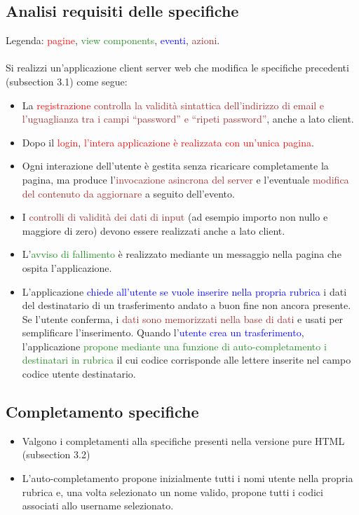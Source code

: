 \documentclass{article}
\begin{document}
\subsection{Analisi requisiti delle specifiche}
Legenda: \textcolor{red}{pagine}, \textcolor{ForestGreen}{view components}, \textcolor{blue}{eventi}, \textcolor{brown}{azioni}.
\\
\\
Si realizzi un’applicazione client server web che modifica le specifiche precedenti (subsection 3.1) come segue:
\begin{itemize}
	\item La  \textcolor{red}{registrazione} \textcolor{brown}{controlla la validità sintattica dell’indirizzo di email e l’uguaglianza tra
		i campi “password” e “ripeti password”}, anche a lato client.
	\item Dopo il  \textcolor{red}{login},  \textcolor{red}{l’intera applicazione è realizzata con un’unica pagina}.
	\item 	Ogni interazione dell’utente è gestita senza ricaricare completamente la pagina, ma
	produce l’\textcolor{brown}{invocazione asincrona del server} e l’eventuale \textcolor{brown}{modifica del contenuto da
		aggiornare} a seguito dell’evento.
	\item I \textcolor{brown}{controlli di validità dei dati di input} (ad esempio importo non nullo e maggiore di zero)
	devono essere realizzati anche a lato client.
	\item L’\textcolor{ForestGreen}{avviso di fallimento} è realizzato mediante un messaggio nella pagina che ospita
	l’applicazione.
	\item L’applicazione \textcolor{blue}{chiede all’utente se vuole inserire nella propria rubrica} i dati del
	destinatario di un trasferimento andato a buon fine non ancora presente. Se l’utente
	conferma, i \textcolor{brown}{dati sono memorizzati nella base di dati} e usati per semplificare
	l’inserimento. Quando l’\textcolor{blue}{utente crea un trasferimento}, l’applicazione  \textcolor{ForestGreen}{propone mediante
		una funzione di auto-completamento i destinatari in rubrica} il cui codice corrisponde
	alle lettere inserite nel campo codice utente destinatario.
\end{itemize}

\subsection{Completamento specifiche}
\begin{itemize}
	\item Valgono  i completamenti alla specifiche presenti nella versione pure HTML (subsection 3.2)
	\item L'auto-completamento propone inizialmente tutti i nomi utente nella propria rubrica e, una volta selezionato un nome valido, propone tutti i codici associati allo username selezionato.
\end{itemize}
\end{document}
